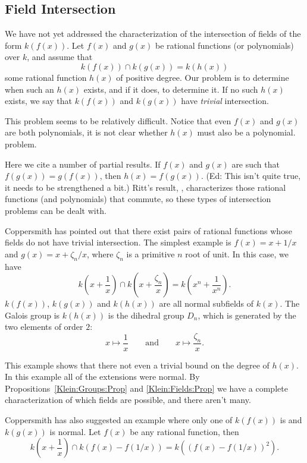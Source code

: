 \subsection{Field Intersection}

We have not yet addressed the characterization of the intersection of
fields of the form $k(f(x))$.  Let $f(x)$ and $g(x)$ be rational
functions (or polynomials) over $k$, and assume that
\[
k(f(x)) \cap k(g(x)) = k(h(x))
\]
some rational function $h(x)$ of positive degree.  Our problem is to
determine when such an $h(x)$ exists, and if it does, to determine it.
If no such $h(x)$ exists, we say that $k(f(x))$ and $k(g(x))$ have
{\em trivial} intersection.

This problem seems to be relatively difficult.  Notice that even
$f(x)$ and $g(x)$ are both polynomials, it is not clear whether $h(x)$
must also be a polynomial. 
problem.  

Here we cite a number of partial results.  If $f(x)$ and $g(x)$ are
such that $f(g(x)) = g(f(x))$, then $h(x) = f(g(x))$.  (Ed: This isn't
quite true, it needs to be strengthened a bit.)  Ritt's result,
, characterizes those rational functions
(and polynomials) that commute, so these types of intersection
problems can be dealt with. 

Coppersmith has pointed out that there exist pairs of rational
functions whose fields do not have trivial intersection. The simplest
example is $f(x) = x + 1/x$ and $g(x) = x + \zeta_n / x$, where
$\zeta_n$ is a primitive $n$\th{} root of unit.  In this case, we have
\[
k\left(x + \frac{1}{x}\right) \cap k\left(x + \frac{\zeta_n}{x}\right) 
= k\left(x^n + \frac{1}{x^n}\right).
\]
$k(f(x))$, $k(g(x))$ and $k(h(x))$ are all normal subfields of
$k(x)$.  The Galois group is $k(h(x))$ is the dihedral group $D_n$,
which is generated by the two elements of order $2$:
\[
x \mapsto \frac{1}{x} \qquad \mbox{and} \qquad
x \mapsto \frac{\zeta_n}{x}.
\]

This example shows that there not even a trivial bound on the degree
of $h(x)$.  In this example all of the extensions were normal.  By
Propositions~\ref{Klein:Groups:Prop} and \ref{Klein:Fields:Prop} we
have a complete characterization of which fields are possible, and
there aren't many.

Coppersmith has also suggested an example where only one of $k(f(x))$
is and $k(g(x))$ is normal.  Let $f(x)$ be any rational function, then
\[
k\left(x + \frac{1}{x}\right) \cap k\left(f(x) - f(1/x)\right) = 
k\left((f(x) - f(1/x))^2\right).
\]

